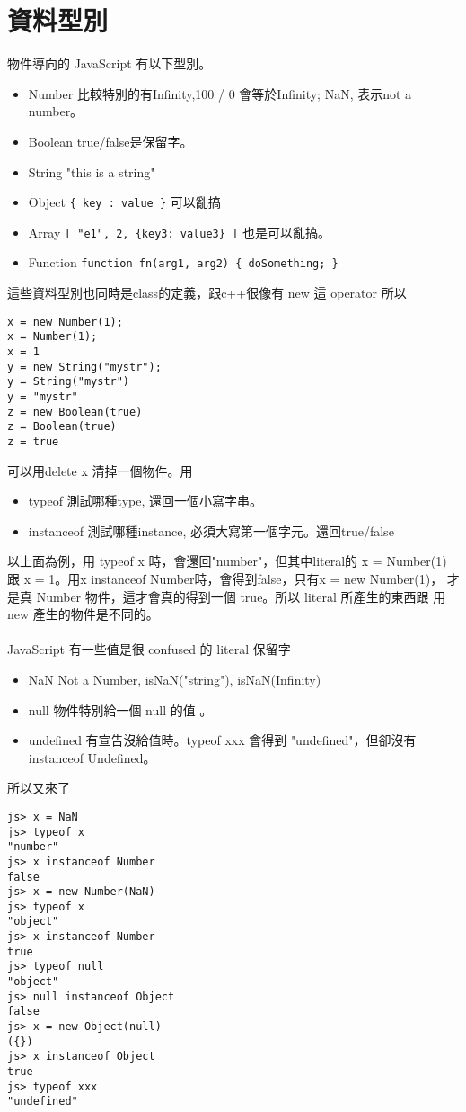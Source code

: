 \section{資料型別}
物件導向的 JavaScript 有以下型別。
\begin{itemize}
  \item Number 比較特別的有Infinity,100 / 0 會等於Infinity; NaN, 表示not a
    number。
  \item Boolean true/false是保留字。
  \item String "this is a string"
  \item Object \verb={ key : value }= 可以亂搞
  \item Array \verb=[ "e1", 2, {key3: value3} ]= 也是可以亂搞。
  \item Function \verb=function fn(arg1, arg2) { doSomething; }=
\end{itemize}
這些資料型別也同時是class的定義，跟c++很像有 new 這 operator 所以
\begin{verbatim}
x = new Number(1);
x = Number(1);
x = 1
y = new String("mystr");
y = String("mystr")
y = "mystr"
z = new Boolean(true)
z = Boolean(true)
z = true
\end{verbatim}
可以用delete x 清掉一個物件。用
\begin{itemize}
  \item typeof 測試哪種type, 還回一個小寫字串。
  \item instanceof 測試哪種instance, 必須大寫第一個字元。還回true/false
\end{itemize}
以上面為例，用 typeof x 時，會還回"number"，但其中literal的 x = Number(1) 
跟 x = 1。用x instanceof Number時，會得到false，只有x = new Number(1)，
才是真 Number 物件，這才會真的得到一個 true。所以 literal 所產生的東西跟
用 new 產生的物件是不同的。
\\\\
JavaScript 有一些值是很 confused 的 literal 保留字
\begin{itemize}
  \item NaN Not a Number, isNaN("string"), isNaN(Infinity)
  \item null 物件特別給一個 null 的值 。
  \item undefined 有宣告沒給值時。typeof xxx 會得到 "undefined"，但卻沒有
    instanceof Undefined。
\end{itemize}
所以又來了
\begin{verbatim}
js> x = NaN
js> typeof x
"number"
js> x instanceof Number
false
js> x = new Number(NaN)
js> typeof x
"object"
js> x instanceof Number
true
js> typeof null
"object"
js> null instanceof Object
false
js> x = new Object(null)
({})
js> x instanceof Object
true
js> typeof xxx
"undefined"
\end{verbatim}
